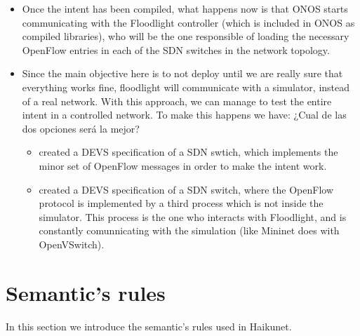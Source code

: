 \documentclass[envcountsect,runningheads]{llncs}
\begin{document}
\begin{itemize}
\item Once the intent has been compiled, what happens now is that ONOS starts communicating with the Floodlight controller (which is included in ONOS as compiled libraries), who will be the one responsible of loading the necessary OpenFlow entries in each of the SDN switches in the network topology.

\item Since the main objective here is to not deploy until we are really sure that everything works fine, floodlight will communicate with a simulator, instead of a real network. With this approach, we can manage to test the entire intent in a controlled network. To make this happens we have: ¿Cual de las dos opciones será la mejor?
	\begin{itemize}
		\item created a DEVS specification of a SDN swtich, which implements the minor set of OpenFlow messages in order to make the intent work.
		\item created a DEVS specification of a SDN switch, where the OpenFlow protocol is implemented by a third process which is not inside the simulator. This process is the one who interacts with Floodlight, and is constantly comunnicating with the simulation (like Mininet does with OpenVSwitch).
	\end{itemize}	 
\end{itemize}

\section{Semantic's rules}

In this section we introduce the semantic's rules used in Haikunet.
\end{document}
